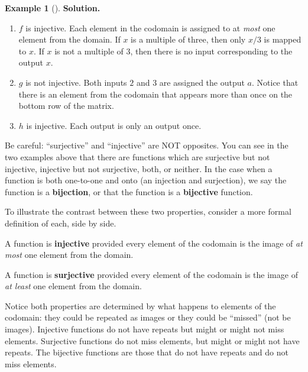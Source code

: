 \documentclass[10pt,]{book}
\newcommand{\terminology}[1]{\textbf{#1}}
\theoremstyle{plain}
\theoremstyle{definition}
\theoremstyle{definition}
\newtheorem{example}[theorem]{Example}
\theoremstyle{definition}
\numberwithin{equation}{chapter}
\begin{document}
\begin{example}[]
\noindent\textbf{Solution.}\hypertarget{solution-253}{}\quad%
\hypertarget{p-2135}{}%
\leavevmode%
\begin{enumerate}
\item\hypertarget{li-381}{}\(f\) is injective. Each element in the codomain is assigned to at \emph{most} one element from the domain. If \(x\) is a multiple of three, then only \(x/3\) is mapped to \(x\). If \(x\) is not a multiple of 3, then there is no input corresponding to the output \(x\).%
\item\hypertarget{li-382}{}\(g\) is not injective. Both inputs \(2\) and \(3\) are assigned the output \(a\). Notice that there is an element from the codomain that appears more than once on the bottom row of the matrix.%
\item\hypertarget{li-383}{}\(h\) is injective. Each output is only an output once.%
\end{enumerate}
%
\end{example}
\hypertarget{p-2136}{}%
Be careful: ``surjective'' and ``injective'' are NOT opposites.  You can see in the two examples above that there are functions which are surjective but not injective, injective but not surjective, both, or neither. In the case when a function is both one-to-one and onto (an injection and surjection), we say the function is a \terminology{bijection}, or that the function is a \terminology{bijective} function.%
\par
\hypertarget{p-2137}{}%
To illustrate the contrast between these two properties, consider a more formal definition of each, side by side.%
\begin{assemblage}\label{assemblage-19}
\hypertarget{p-2138}{}%
A function is \terminology{injective} provided every element of the codomain is the image of \emph{at most} one element from the domain.%
\par
\hypertarget{p-2139}{}%
A function is \terminology{surjective} provided every element of the codomain is the image of \emph{at least} one element from the domain.%
\end{assemblage}
\hypertarget{p-2140}{}%
Notice both properties are determined by what happens to elements of the codomain: they could be repeated as images or they could be ``missed'' (not be images).  Injective functions do not have repeats but might or might not miss elements.  Surjective functions do not miss elements, but might or might not have repeats.  The bijective functions are those that do not have repeats and do not miss elements.%
\typeout{************************************************}
\typeout{************************************************}
\end{document}
